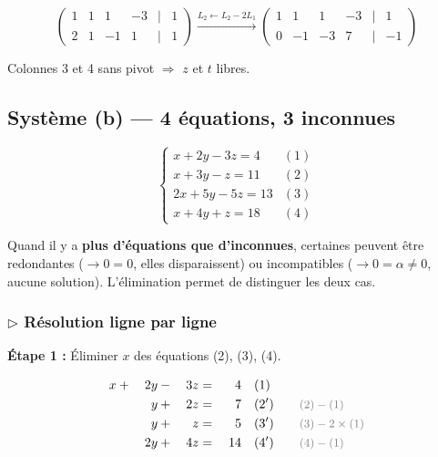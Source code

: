 \documentclass[12pt,a4paper]{article}
\newcommand{\ann}[1]{\qquad\textcolor{opcolor}{\text{\small #1}}}
\begin{document}
\[
\begin{pmatrix}
1 & 1 & 1 & -3 & \mid & 1 \\
2 & 1 & -1 & 1 & \mid & 1
\end{pmatrix}
\xrightarrow{L_2 \leftarrow L_2 - 2L_1}
\begin{pmatrix}
1 & 1 & 1 & -3 & \mid & 1 \\
0 & -1 & -3 & 7 & \mid & -1
\end{pmatrix}
\]

Colonnes 3 et 4 sans pivot $\Rightarrow$ $z$ et $t$ libres.

\subsection{Système (b) --- 4 équations, 3 inconnues}

\[
\begin{cases}
  x + 2y - 3z = 4 & (1)\\
  x + 3y - z = 11 & (2)\\
  2x + 5y - 5z = 13 & (3)\\
  x + 4y + z = 18 & (4)
\end{cases}
\]

\begin{methode}
Quand il y a \textbf{plus d'équations que d'inconnues}, certaines peuvent être redondantes ($\to 0=0$, elles disparaissent) ou incompatibles ($\to 0=\alpha\neq 0$, aucune solution). L'élimination permet de distinguer les deux cas.
\end{methode}

\subsubsection*{$\triangleright$ Résolution ligne par ligne}

\textbf{Étape 1 :} Éliminer $x$ des équations (2), (3), (4).

\begin{alignat*}{4}
  x &{}+{}& 2y  &{}-{}& 3z &{}={}& 4   &\quad (1)\\
    &     & y   &{}+{}& 2z &{}={}& 7   &\quad (2') \ann{$(2)-(1)$}\\
    &     & y   &{}+{}& z  &{}={}& 5   &\quad (3') \ann{$(3)-2\times(1)$}\\
    &     & 2y  &{}+{}& 4z &{}={}& 14  &\quad (4') \ann{$(4)-(1)$}
\end{alignat*}
\end{document}
